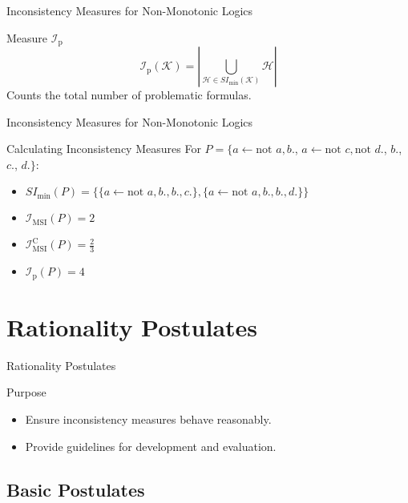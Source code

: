 \begin{frame}{Inconsistency Measures for Non-Monotonic Logics}
    \begin{block}{Measure $\mathcal{I}_{\text{p}}$}
        \[
            \mathcal{I}_{\text{p}}(\mathcal{K}) = \left| \bigcup_{\mathcal{H} \in SI_{\min}(\mathcal{K})} \mathcal{H} \right|
        \]
        Counts the total number of problematic formulas.
    \end{block}
\end{frame}

\begin{frame}{Inconsistency Measures for Non-Monotonic Logics}
    \begin{exampleblock}{Calculating Inconsistency Measures}
        For $P = \{a \leftarrow \text{not } a, b.$, $a \leftarrow \text{not } c, \text{not } d.$, $b.$, $c.$, $d.\}$:

        \begin{itemize}
            \item $SI_{\min}(P) = \{\{a \leftarrow \text{not } a, b., b., c.\}, \{a \leftarrow \text{not } a, b., b., d.\}\}$
            \item $\mathcal{I}_{\text{MSI}}(P) = 2$
            \item $\mathcal{I}_{\text{MSI}}^\text{C}(P) = \frac{2}{3}$
            \item $\mathcal{I}_{\text{p}}(P) = 4$
        \end{itemize}
    \end{exampleblock}
\end{frame}

\section{Rationality Postulates}

\begin{frame}{Rationality Postulates}
    \begin{block}{Purpose}
        \begin{itemize}
            \item Ensure inconsistency measures behave reasonably.
            \item Provide guidelines for development and evaluation.
        \end{itemize}
    \end{block}
\end{frame}

\subsection{Basic Postulates}

